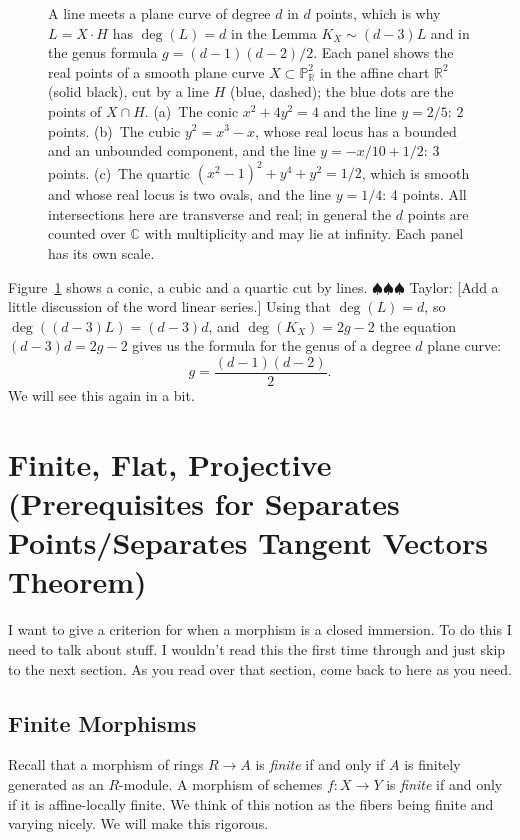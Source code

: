 \documentclass[12pt]{article}
\numberwithin{equation}{section}
\theoremstyle{definition}
\theoremstyle{remark}
\newcommand{\RR}{\mathbb{R}}
\newcommand{\CC}{\mathbb{C}}
\newcommand{\PP}{\mathbb{P}}
\newcommand{\taylor}[1]{{\color{blue} \sf $\spadesuit\spadesuit\spadesuit$ Taylor: [#1]}}
\begin{document}
\begin{figure}[H]
\centering

\caption{A line meets a plane curve of degree $d$ in $d$ points, which is why $L=X\cdot H$ has $\deg(L)=d$ in the Lemma $K_X\sim(d-3)L$ and in the genus formula $g=(d-1)(d-2)/2$. Each panel shows the real points of a smooth plane curve $X\subset\PP^2_{\RR}$ in the affine chart $\RR^2$ (solid black), cut by a line $H$ (blue, dashed); the blue dots are the points of $X\cap H$. (a)~The conic $x^2+4y^2=4$ and the line $y=2/5$: $2$ points. (b)~The cubic $y^2=x^3-x$, whose real locus has a bounded and an unbounded component, and the line $y=-x/10+1/2$: $3$ points. (c)~The quartic $(x^2-1)^2+y^4+y^2=1/2$, which is smooth and whose real locus is two ovals, and the line $y=1/4$: $4$ points. All intersections here are transverse and real; in general the $d$ points are counted over $\CC$ with multiplicity and may lie at infinity. Each panel has its own scale.}\label{fig:plane-curves-cut-by-lines}
\end{figure}
Figure~\ref{fig:plane-curves-cut-by-lines} shows a conic, a cubic and a quartic cut by lines.
\taylor{Add a little discussion of the word linear series.}
Using that $\deg(L) = d$, so $\deg((d-3)L) = (d-3)d$, and $\deg(K_X)=2g-2$ the equation $(d-3)d=2g-2$ gives us the formula for the genus of a degree $d$ plane curve:
 $$ g = \dfrac{(d-1)(d-2)}{2}.$$
We will see this again in a bit. 


\section{Finite, Flat, Projective (Prerequisites for Separates Points/Separates Tangent Vectors Theorem)}
I want to give a criterion for when a morphism is a closed immersion. 
To do this I need to talk about stuff. 
I wouldn't read this the first time through and just skip to the next section. 
As you read over that section, come back to here as you need.

\subsection{Finite Morphisms}
Recall that a morphism of rings $R\to A$ is \emph{finite} if and only if $A$ is finitely generated as an $R$-module. 
A morphism of schemes $f:X\to Y$ is \emph{finite} if and only if it is affine-locally finite.
We think of this notion as the fibers being finite and varying nicely. 
We will make this rigorous. 
\end{document}
